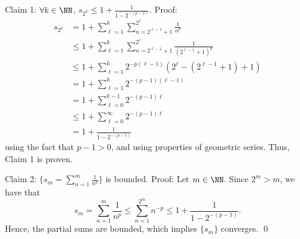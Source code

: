 Claim 1: $\forall k\in \NN$, 
$s_{2^k} \leq 1 + \frac{1}{1-2^{-(p-1)}}$. Proof:
\begin{align*}
    s_{2^k} &= 1+ \sum_{\ell=1}^k \sum_{n=2^{\ell-1}+1}^{2^\ell} \frac{1}{n^p} \\
    &\leq 1+ \sum_{\ell=1}^k \sum_{n=2^{\ell-1}+1}^{2^\ell} \frac{1}{(2^{\ell-1}+1)^p} \\
    &\leq 1+ \sum_{\ell=1}^k 2^{-p(\ell-1)}(2^\ell-(2^{\ell-1}+1)+1) \\
    &= 1+ \sum_{\ell=1}^k 2^{-(p-1)(\ell-1)} \\
    &= 1+ \sum_{\ell=0}^{k-1} 2^{-(p-1)\ell} \\
    &\leq 1+ \sum_{\ell=0}^\infty 2^{-(p-1)\ell} \\
    &= 1 + \frac{1}{1-2^{-(p-1)}}
\end{align*}
using the fact that $p-1>0$, and using properties of geometric series. Thus, Claim 1 is proven. 

Claim 2: $\{s_m = \sum_{n=1}^m \frac{1}{n^p}\}$ is bounded. Proof: Let $m\in\NN$. Since $2^m >m$, we have that 
\[
s_m = \sum_{n=1}^m \frac{1}{n^p} \leq \sum_{n=1}^{2^m}n^{-p} \leq 1 + \frac{1}{1-2^{-(p-1)}}.
\]
Hence, the partial sums are bounded, which implies $\{s_m\}$ converges. \qed